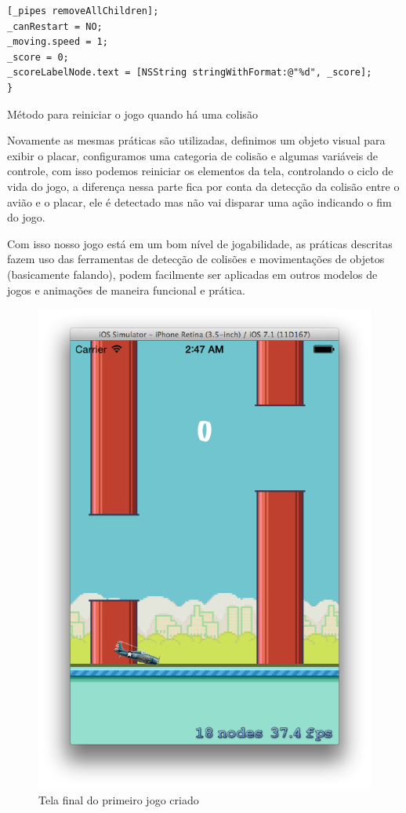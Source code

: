 \documentclass[a4paper,12pt,brazil,doubleside]{book}
\begin{document}
\begin{singlespace}
\begin{listing}[H]
\begin{verbatim}
[_pipes removeAllChildren];
_canRestart = NO;
_moving.speed = 1;
_score = 0;
_scoreLabelNode.text = [NSString stringWithFormat:@"%d", _score];
}
\end{verbatim}
\caption{Método para reiniciar o jogo quando há uma colisão}
\end{listing}

Novamente as mesmas práticas são utilizadas, definimos um objeto visual para exibir o placar, configuramos uma categoria de colisão e algumas variáveis de controle, com isso podemos reiniciar os elementos da tela, controlando o ciclo de vida do jogo, a diferença nessa parte fica por conta da detecção da colisão entre o avião e o placar, ele é detectado mas não vai disparar uma ação indicando o fim do jogo.

Com isso nosso jogo está em um bom nível de jogabilidade, as práticas descritas fazem uso das ferramentas de detecção de colisões e movimentações de objetos (basicamente falando), podem facilmente ser aplicadas em outros modelos de jogos e animações de maneira funcional e prática.

\begin{figure}[H]
  \centering
  \includegraphics[width=.75\textwidth]{figuras/6/plane6.png}
  \caption{Tela final do primeiro jogo criado}
  \label{fig:a}
\end{figure}


\end{singlespace}
\end{document}
